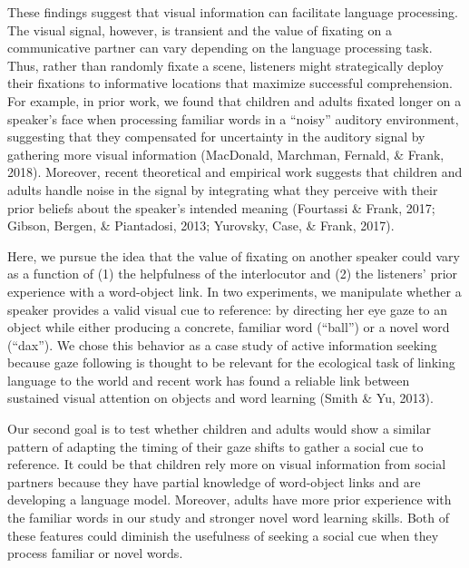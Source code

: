 \documentclass[10pt, letterpaper]{article}
\begin{document}
These findings suggest that visual information can facilitate language
processing. The visual signal, however, is transient and the value of
fixating on a communicative partner can vary depending on the language
processing task. Thus, rather than randomly fixate a scene, listeners
might strategically deploy their fixations to informative locations that
maximize successful comprehension. For example, in prior work, we found
that children and adults fixated longer on a speaker's face when
processing familiar words in a ``noisy'' auditory environment,
suggesting that they compensated for uncertainty in the auditory signal
by gathering more visual information (MacDonald, Marchman, Fernald, \&
Frank, 2018). Moreover, recent theoretical and empirical work suggests
that children and adults handle noise in the signal by integrating what
they perceive with their prior beliefs about the speaker's intended
meaning (Fourtassi \& Frank, 2017; Gibson, Bergen, \& Piantadosi, 2013;
Yurovsky, Case, \& Frank, 2017).

Here, we pursue the idea that the value of fixating on another speaker
could vary as a function of (1) the helpfulness of the interlocutor and
(2) the listeners' prior experience with a word-object link. In two
experiments, we manipulate whether a speaker provides a valid visual cue
to reference: by directing her eye gaze to an object while either
producing a concrete, familiar word (``ball'') or a novel word
(``dax''). We chose this behavior as a case study of active information
seeking because gaze following is thought to be relevant for the
ecological task of linking language to the world and recent work has
found a reliable link between sustained visual attention on objects and
word learning (Smith \& Yu, 2013).

Our second goal is to test whether children and adults would show a
similar pattern of adapting the timing of their gaze shifts to gather a
social cue to reference. It could be that children rely more on visual
information from social partners because they have partial knowledge of
word-object links and are developing a language model. Moreover, adults
have more prior experience with the familiar words in our study and
stronger novel word learning skills. Both of these features could
diminish the usefulness of seeking a social cue when they process
familiar or novel words.
\end{document}

